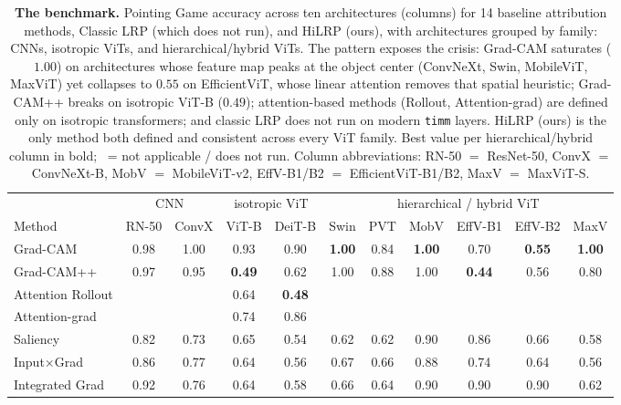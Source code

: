 \documentclass[lettersize,journal]{IEEEtran}
\newcommand{\nd}{\textemdash}            %
\begin{document}
\begin{table}[t]
  \centering
  \caption{\textbf{The benchmark.} Pointing Game accuracy across ten architectures (columns) for 14 baseline attribution methods, Classic LRP (which does not run), and HiLRP (ours), with architectures grouped by family: CNNs, isotropic ViTs, and hierarchical/hybrid ViTs. The pattern exposes the crisis: Grad-CAM saturates ($1.00$) on architectures whose feature map peaks at the object center (ConvNeXt, Swin, MobileViT, MaxViT) yet collapses to $0.55$ on EfficientViT, whose linear attention removes that spatial heuristic; Grad-CAM++ breaks on isotropic ViT-B ($0.49$); attention-based methods (Rollout, Attention-grad) are defined only on isotropic transformers; and classic LRP does not run on modern \texttt{timm} layers. HiLRP (ours) is the only method both defined and consistent across every ViT family. Best value per hierarchical/hybrid column in bold; \nd\ = not applicable / does not run. Column abbreviations: RN-50 $=$ ResNet-50, ConvX $=$ ConvNeXt-B, MobV $=$ MobileViT-v2, EffV-B1/B2 $=$ EfficientViT-B1/B2, MaxV $=$ MaxViT-S.}
  \label{tab:bigbench}
  \setlength{\tabcolsep}{4pt}
  \scriptsize
  \begin{tabular}{l cc cc cccccc}
    \toprule
    & \multicolumn{2}{c}{CNN} & \multicolumn{2}{c}{isotropic ViT} & \multicolumn{6}{c}{hierarchical / hybrid ViT} \\
    \cmidrule(lr){2-3}\cmidrule(lr){4-5}\cmidrule(lr){6-11}
    Method & RN-50 & ConvX & ViT-B & DeiT-B & Swin & PVT & MobV & EffV-B1 & EffV-B2 & MaxV \\
    \midrule
    Grad-CAM          & 0.98 & 1.00 & 0.93 & 0.90 & \textbf{1.00} & 0.84 & \textbf{1.00} & 0.70 & \textbf{0.55} & \textbf{1.00} \\
    Grad-CAM++        & 0.97 & 0.95 & \textbf{0.49} & 0.62 & 1.00 & 0.88 & 1.00 & \textbf{0.44} & 0.56 & 0.80 \\
    Attention Rollout & \nd & \nd & 0.64 & \textbf{0.48} & \nd & \nd & \nd & \nd & \nd & \nd \\
    Attention-grad    & \nd & \nd & 0.74 & 0.86 & \nd & \nd & \nd & \nd & \nd & \nd \\
    Saliency          & 0.82 & 0.73 & 0.65 & 0.54 & 0.62 & 0.62 & 0.90 & 0.86 & 0.66 & 0.58 \\
    Input$\times$Grad & 0.86 & 0.77 & 0.64 & 0.56 & 0.67 & 0.66 & 0.88 & 0.74 & 0.64 & 0.56 \\
    Integrated Grad   & 0.92 & 0.76 & 0.64 & 0.58 & 0.66 & 0.64 & 0.90 & 0.90 & 0.90 & 0.62 \\

\end{tabular}
\end{table}
\end{document}
